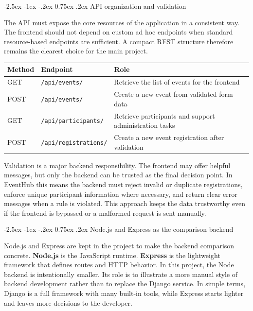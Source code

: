 \documentclass[11pt,a4paper]{article}
\makeatletter
\renewcommand\subsection{\@startsection{subsection}{2}{\z@}%
  {-2.5ex \@plus -1ex \@minus -.2ex}%
  {0.75ex \@plus .2ex}%
  {\normalfont\large\sffamily\bfseries\color{MidnightBlue}}}
\makeatother
\begin{document}
\subsection{API organization and validation}

The API must expose the core resources of the application in a consistent way. The frontend should not depend on custom ad hoc endpoints when standard resource-based endpoints are sufficient. A compact REST structure therefore remains the clearest choice for the main project.

\begin{center}
\begin{tabularx}{\textwidth}{@{}l l Y@{}}
\toprule
\textbf{Method} & \textbf{Endpoint} & \textbf{Role} \\
\midrule
GET & \texttt{/api/events/} & Retrieve the list of events for the frontend \\
POST & \texttt{/api/events/} & Create a new event from validated form data \\
GET & \texttt{/api/participants/} & Retrieve participants and support administration tasks \\
POST & \texttt{/api/registrations/} & Create a new event registration after validation \\
\bottomrule
\end{tabularx}
\end{center}

Validation is a major backend responsibility. The frontend may offer helpful messages, but only the backend can be trusted as the final decision point. In EventHub this means the backend must reject invalid or duplicate registrations, enforce unique participant information where necessary, and return clear error messages when a rule is violated. This approach keeps the data trustworthy even if the frontend is bypassed or a malformed request is sent manually.

\subsection{Node.js and Express as the comparison backend}

Node.js and Express are kept in the project to make the backend comparison concrete. \textbf{Node.js} is the JavaScript runtime. \textbf{Express} is the lightweight framework that defines routes and HTTP behavior. In this project, the Node backend is intentionally smaller. Its role is to illustrate a more manual style of backend development rather than to replace the Django service. In simple terms, Django is a full framework with many built-in tools, while Express starts lighter and leaves more decisions to the developer.
\end{document}
